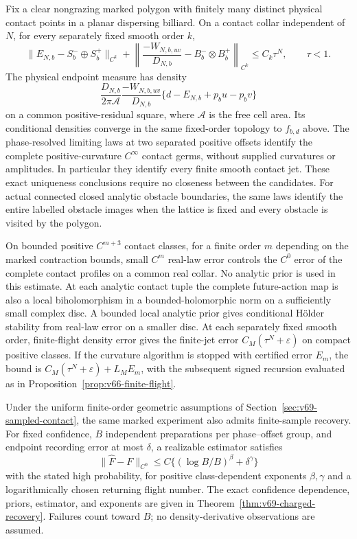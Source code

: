 \begin{theorem}
\label{thm:v66-main}
Fix a clear nongrazing marked polygon with finitely many distinct physical
contact points in a planar dispersing billiard.  On a contact collar
independent of $N$, for every separately fixed smooth order $k$,
\begin{equation}\label{eq:v67-principal-relative}
 \|E_{N,b}-S_b^-\oplus S_b^+\|_{C^k}
 +\left\|\frac{-W_{N,b,uv}}{D_{N,b}}
                       -B_b^-\otimes B_b^+\right\|_{C^k}
                                      \le C_k\tau^N,\qquad \tau<1.
\end{equation}
The physical endpoint measure has density
\[
 \frac{D_{N,b}}{2\pi\mathcal A}
       \frac{-W_{N,b,uv}}{D_{N,b}}
       \{d-E_{N,b}+p_bu-p_bv\}
\]
on a common positive-residual square, where $\mathcal A$ is the free
cell area.  Its conditional densities converge in the same fixed-order
topology to $f_{b,d}$ above.  The phase-resolved limiting laws at two separated positive offsets
identify the complete positive-curvature $C^\infty$ contact germs,
without supplied curvatures or amplitudes.  In particular they identify
every finite smooth contact jet.  These exact uniqueness conclusions
require no closeness between the candidates.
For actual connected closed analytic obstacle boundaries, the same laws
identify the entire labelled obstacle images when the lattice is fixed
and every obstacle is visited by the polygon.

On bounded positive $C^{m+3}$ contact classes, for a finite order $m$
depending on the marked contraction bounds, small $C^m$ real-law error
controls the $C^0$ error of the complete contact profiles on a common
real collar.  No analytic prior is used in this estimate.
At each analytic contact tuple the complete future-action map is also a
local biholomorphism in a bounded-holomorphic norm on a sufficiently small
complex disc.  A bounded local analytic prior gives conditional H\"older
stability from real-law error on a smaller disc.  At each separately fixed
smooth order, finite-flight density error gives the finite-jet error
$C_M(\tau^N+\varepsilon)$ on compact positive classes.  If the
curvature algorithm is stopped with certified error $E_m$, the bound
is $C_M(\tau^N+\varepsilon)+L_ME_m$, with the subsequent signed
recursion evaluated as in Proposition~\ref{prop:v66-finite-flight}.

Under the uniform finite-order geometric assumptions of
Section~\ref{sec:v69-sampled-contact}, the same marked experiment also
admits finite-sample recovery.  For fixed confidence, $B$ independent
preparations per phase--offset group, and endpoint recording error at most
$\delta$, a realizable estimator satisfies
\[
 \|\widehat F-F\|_{C^0}\le
 C\{(\log B/B)^\beta+\delta^\gamma\}
\]
with the stated high probability, for positive class-dependent exponents
$\beta,\gamma$ and a logarithmically chosen returning flight number.
The exact confidence dependence, priors, estimator, and exponents are
given in Theorem~\ref{thm:v69-charged-recovery}.  Failures count toward
$B$; no density-derivative observations are assumed.
\end{theorem}
